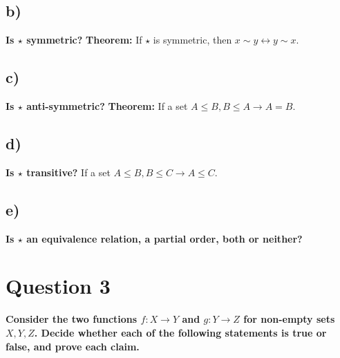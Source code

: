 \documentclass{article}
\begin{document}
\subsection{b)}
\textbf{Is $\star $ symmetric?}
\newline
\newline
\textbf{Theorem: } If $\star$ is symmetric, then $x \sim y \leftrightarrow y \sim x.$
\newline
{}
\newpage
\subsection{c)}
\textbf{Is $\star $ anti-symmetric? }
\newline
\newline
\textbf{Theorem: } If a set $A \leq B, B \leq A \rightarrow A = B.$
\newline
{}
\newpage
\subsection{d)}
\textbf{ Is $\star $ transitive?}
\newline
\newline
If a set $A \leq B, B \leq C \rightarrow A \leq C.$
\newline
{}
\newpage
\subsection{e)}
\textbf{ Is $\star $ an equivalence relation, a partial order, both or neither?}
\newline
{}
\newpage
\section{Question 3}
\textbf{ Consider the two functions $f: X \rightarrow Y$ and $g: Y \rightarrow Z$ for non-empty sets $X, Y, Z$.
Decide whether each of the following statements is true or false, and prove each claim.}
\end{document}

